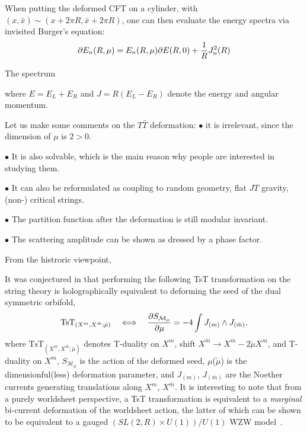 \documentclass[11pt,a4paper]{article}
\begin{document}
When putting the deformed CFT on a cylinder, with $(x, \bar x) \sim (x+ 2\pi R, \bar x+2\pi R)$, one can then evaluate the energy spectra via invisited Burger's equation:
\begin{equation}
    \partial E_n(R, \mu)= E_n(R, \mu) \partial E(R, 0)+\frac 1{R} J_n^2(R)
\end{equation}

The spectrum 

where $E = E_L + E_R$ and $J = R(E_L - E_R)$ denote the energy and angular momentum.  

Let us make some comments on the $T\bar T$ deformation:
$\bullet$ it is irrelevant, since the dimension of $\mu$ is $2>0$. 

$\bullet$ It is also solvable, which is the main reason why people are interested in studying them. 

$\bullet$ It can also be reformulated as coupling to random geometry, flat $JT$ gravity, (non-) critical strings. 

$\bullet$ The partition function after the deformation is still modular invariant. 

$\bullet$ The scattering amplitude can be shown as dressed by a phase factor. 

From the histroric viewpoint, 



It was conjectured in \cite{Apolo:2019zai} that performing the following TsT transformation on the string theory is holographically equivalent to deforming the seed of the dual symmetric orbifold,
\begin{equation}
\textrm{TsT}_{(X^m,X^{\bar m};\check\mu)} \quad\Longleftrightarrow\quad  \frac{\partial S_{\mathcal M_\mu}}{\partial \mu} = -4 \int J_{(m)} \wedge J_{(\bar{m})}, \label{conjecture}
\end{equation}
where $\textrm{TsT}_{(X^m,X^{\bar m};\check\mu)}$ denotes T-duality on  $X^m$, shift $ X^{\bar m} \to X^{\bar m} - 2\check\mu X^m$,  and T-duality on $ X^m$, $S_{\mathcal M_\mu}$ is the action of the deformed seed, $\mu$($\check\mu$) is the dimensionful(less) deformation parameter, and $J_{(m)}$, $J_{(\bar{m})}$ are the Noether currents generating translations along $X^m$, $X^{\bar m}$. It is interesting to note that from a purely worldsheet perspective, a TsT transformation is equivalent to a \emph{marginal} bi-current deformation of the worldsheet action, the latter of which can be shown to be equivalent to a gauged $(SL(2,R) \times U(1))/ U(1)$ WZW model~\cite{Apolo:2019zai}.



\pagebreak
 

\end{document}
